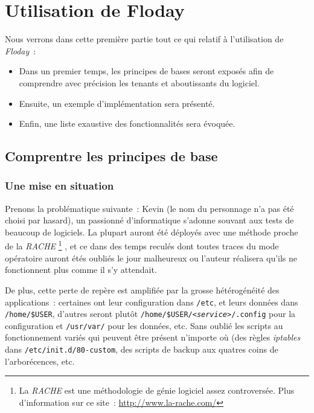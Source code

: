 \section{Utilisation de Floday}

\begin{intro}
	Nous verrons dans cette première partie tout ce qui relatif à l'utilisation de \emph{Floday}~:
	\begin{itemize}
		\item Dans un premier temps, les principes de bases seront exposés afin de comprendre avec précision les tenants et aboutissants du logiciel.
		\item Ensuite, un exemple d'implémentation sera présenté.
		\item Enfin, une liste exaustive des fonctionnalités sera évoquée.
	\end{itemize}
\end{intro}

\subsection{Comprentre les principes de base}

\subsubsection{Une mise en situation}

Prenons la problématique suivante~:
Kevin (le nom du personnage n'a pas été choisi par hasard), un passionné d'informatique s'adonne souvant aux tests de beaucoup de logiciels.
La plupart auront été déployés avec une méthode proche de la \emph{RACHE}%
\footnote{La \emph{RACHE} est une méthodologie de génie logiciel assez controversée. Plus d'information sur ce site~: \url{http://www.la-rache.com/}}%
, et ce dans des temps reculés dont toutes traces du mode opératoire auront étés oubliés le jour malheureux ou l'auteur réalisera qu'ils ne fonctionnent plus comme il s'y attendait.

De plus, cette perte de repère est amplifiée par la grosse hétérogénéité des applications~: certaines ont leur configuration dans {\tt/etc}, et leurs données dans {\tt/home/\$USER}, d'autres seront plutôt {\tt/home/\$USER/\emph{<service>}/.config} pour la configuration et {\tt/usr/var/} pour les données, etc.
Sans oublié les scripts au fonctionnement variés qui peuvent être présent n'importe où (des règles \emph{iptables} dans {\tt/etc/init.d/80-custom}, des scripts de backup aux quatres coins de l'arborécences, etc.

